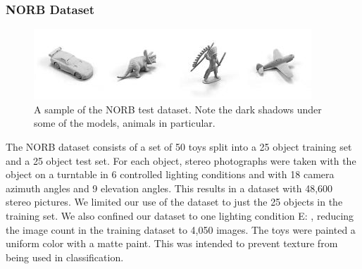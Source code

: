 \documentclass[10pt,twocolumn,letterpaper]{article}
\newcommand{\tompson}[1]{{\color{green} JT: #1}}
\newcommand{\edit}[1]{{\color{red} E: #1}}
\begin{document}
\subsubsection{NORB Dataset}\label{NORB-DATASET}

\begin{figure}[h!]
\centering
\includegraphics[width=1.0\columnwidth]{./assets/NORBTestSmall.png}
\caption{A sample of the NORB test dataset. Note the dark shadows under some of the models, animals in particular.}
\label{fig:norb-samples}
\end{figure}
The NORB dataset consists of a set of 50 toys split into a 25 object training set and a 25 object test set. For each object, stereo photographs were taken with the object on a turntable in 6 controlled lighting conditions and with 18 camera azimuth angles and 9 elevation angles. This results in a dataset with 48,600 stereo pictures.  We limited our use of the dataset to just the 25 objects in the training set.%
We also confined our dataset to one lighting condition\edit{, %
reducing} the image count in the training dataset to 4,050 images.   The toys were painted a uniform color with a matte paint. This was intended to prevent texture from being used in classification.
\end{document}
